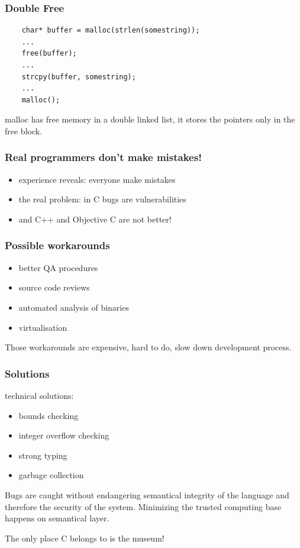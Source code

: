 \documentclass[compress]{beamer}
\begin{document}
\begin{frame}[fragile]
  \frametitle{Double Free}
  \begin{verbatim}
    char* buffer = malloc(strlen(somestring));
    ...
    free(buffer);
    ...
    strcpy(buffer, somestring);
    ...
    malloc();
  \end{verbatim}
  malloc has free memory in a double linked list, it stores the pointers only in the free block.
\end{frame}

\begin{frame}
  \frametitle{Real programmers don't make mistakes!}
  \begin{itemize}
  \item experience reveals: everyone make mistakes
  \item the real problem: in C bugs are vulnerabilities
  \item and C++ and Objective C are not better!
  \end{itemize}
\end{frame}

\begin{frame}
  \frametitle{Possible workarounds}
  \begin{itemize}
  \item better QA procedures
  \item source code reviews
  \item automated analysis of binaries
  \item virtualisation
  \end{itemize}
  Those workarounds are expensive, hard to do,
  slow down development process.
\end{frame}

\begin{frame}
  \frametitle{Solutions}
  technical solutions:
  \begin{itemize}
  \item bounds checking
  \item integer overflow checking
  \item strong typing
  \item garbage collection
  \end{itemize}
  Bugs are caught without endangering semantical integrity
  of the language and therefore the security of the system.
  Minimizing the trusted computing base happens on semantical layer.

  The only place C belongs to is the museum!
\end{frame}
\end{document}
